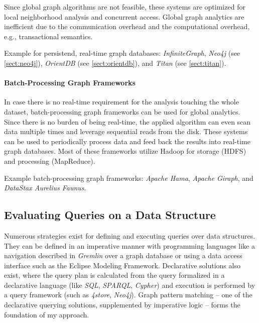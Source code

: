 Since global graph algorithms are not feasible, these systems are optimized for local neighborhood analysis and concurrent access. Global graph analytics are inefficient due to the communication overhead and the computational overhead, e.g., transactional semantics.

Example for persistend, real-time graph databases: \emph{InfiniteGraph}, \emph{Neo4j} (see \cref{sect:neo4j}), \emph{OrientDB} (see \cref{sect:orientdb}), and \emph{Titan} (see \cref{sect:titan}).

\paragraph{Batch-Processing Graph Frameworks}
In case there is no real-time requirement for the analysis touching the whole dataset, batch-processing graph frameworks can be used for global analytics. Since there is no burden of being real-time, the applied algorithm can even scan data multiple times and leverage sequential reads from the disk. These systems can be used to periodically process data and feed back the results into real-time graph databases. Most of these frameworks utilize Hadoop for storage (HDFS) and processing (MapReduce).

Example batch-processing graph frameworks: \emph{Apache Hama}, \emph{Apache Giraph}, and \emph{DataStax Aurelius Faunus}.


\subsection{Evaluating Queries on a Data Structure}
Numerous strategies exist for defining and executing queries over data structures. They can be defined in an imperative manner with programming languages like a navigation described in \emph{Gremlin} over a graph database or using a data access interface such as the Eclipse Modeling Framework. Declarative solutions also exist, where the query plan is calculated from the query formalized in a declarative language (like \emph{SQL}, \emph{SPARQL}, \emph{Cypher}) and execution is performed by a query framework (such as \emph{4store}, \emph{Neo4j}). Graph pattern matching -- one of the declarative querying solutions, supplemented by imperative logic -- forms the foundation of my approach.


